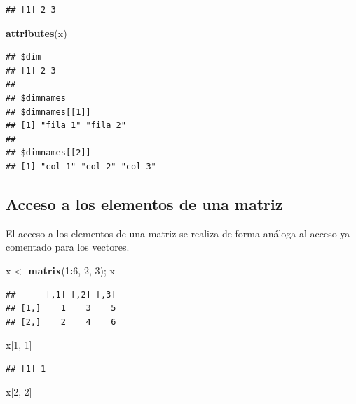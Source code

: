 \documentclass[]{book}
\newenvironment{Shaded}{\begin{snugshade}}{\end{snugshade}}
\newcommand{\DecValTok}[1]{\textcolor[rgb]{0.00,0.00,0.81}{#1}}
\newcommand{\KeywordTok}[1]{\textcolor[rgb]{0.13,0.29,0.53}{\textbf{#1}}}
\newcommand{\NormalTok}[1]{#1}
\newcommand{\OperatorTok}[1]{\textcolor[rgb]{0.81,0.36,0.00}{\textbf{#1}}}
\newcommand{\StringTok}[1]{\textcolor[rgb]{0.31,0.60,0.02}{#1}}
\begin{document}
\begin{verbatim}
## [1] 2 3
\end{verbatim}

\begin{Shaded}
\begin{Highlighting}[]
\KeywordTok{attributes}\NormalTok{(x)}
\end{Highlighting}
\end{Shaded}

\begin{verbatim}
## $dim
## [1] 2 3
## 
## $dimnames
## $dimnames[[1]]
## [1] "fila 1" "fila 2"
## 
## $dimnames[[2]]
## [1] "col 1" "col 2" "col 3"
\end{verbatim}

\hypertarget{acceso-a-los-elementos-de-una-matriz}{%
\subsection{Acceso a los elementos de una matriz}\label{acceso-a-los-elementos-de-una-matriz}}

El acceso a los elementos de una matriz se realiza de forma análoga al acceso ya
comentado para los vectores.

\begin{Shaded}
\begin{Highlighting}[]
\NormalTok{x <-}\StringTok{ }\KeywordTok{matrix}\NormalTok{(}\DecValTok{1}\OperatorTok{:}\DecValTok{6}\NormalTok{, }\DecValTok{2}\NormalTok{, }\DecValTok{3}\NormalTok{); x}
\end{Highlighting}
\end{Shaded}

\begin{verbatim}
##      [,1] [,2] [,3]
## [1,]    1    3    5
## [2,]    2    4    6
\end{verbatim}

\begin{Shaded}
\begin{Highlighting}[]
\NormalTok{x[}\DecValTok{1}\NormalTok{, }\DecValTok{1}\NormalTok{]}
\end{Highlighting}
\end{Shaded}

\begin{verbatim}
## [1] 1
\end{verbatim}

\begin{Shaded}
\begin{Highlighting}[]
\NormalTok{x[}\DecValTok{2}\NormalTok{, }\DecValTok{2}\NormalTok{]}
\end{Highlighting}
\end{Shaded}
\end{document}
